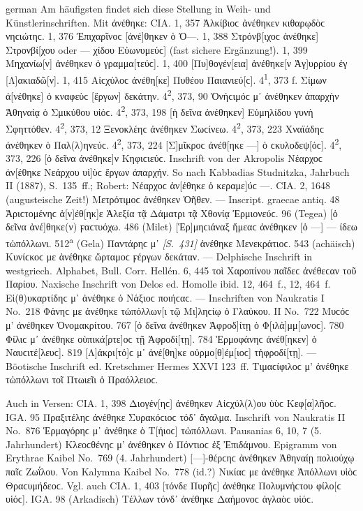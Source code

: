 \begin{otherlanguage*}{german}
Am häufigsten findet sich diese Stellung in Weih- und Künstlerinschriften. Mit ἀνέθηκε: CIA. 1, 357 Ἀλκίβιοϲ ἀνέθηκεν κιθαρῳδὸϲ νηϲιώτηϲ. 1, 376 Ἐπιχαρῖνοϲ [ἀνέ]θηκεν ὁ Ὀ—. 1, 388 Στρόνβ[ιχοϲ ἀνέθηκε] Στρονβί[χου oder — χίδου Εὐ\-ω\-νυ\-μεύϲ] (fast sichere Ergänzung!). 1, 399 Μηχανίω[ν] ἀνέθηκεν ὁ γραμμα[τεύϲ]. 1, 400 [Πυ]θογέν[εια] ἀνέθηκε[ν Ἀγ]υρρίου ἐγ [Λ]ακιαδῶ[ν]. 1, 415 Αἰϲχύλοϲ ἀνέθη[κε] Πυθέου Παιανιεύ[ϲ]. 4\textsuperscript{1}, 373 f. Σίμων ἀ[νέθηκε] ὁ κναφεὺϲ [ἔργων] δεκάτην. 4\textsuperscript{2}, 373, 90 Ὀνήϲιμόϲ μ᾽ ἀνέθηκεν ἀπαρχὴν Ἀθηναίᾳ ὁ Σμικύθου υἱόϲ. 4\textsuperscript{2}, 373, 198 [ἡ δεῖνα ἀνέθηκεν] Εὐμηλίδου γυνὴ Σφηττόθεν. 4\textsuperscript{2}, 373, 12 Ξενοκλέηϲ ἀνέθηκεν Σωϲίνεω. 4\textsuperscript{2}, 373, 223 Χναϊάδηϲ ἀνέ\-θη\-κεν ὁ Παλ(λ)ηνεύϲ. 4\textsuperscript{2}, 373, 224 [Σ]μῖκροϲ ἀνέ\-θ[η\-κε —] ὁ ϲκυλοδεψ[όϲ]. 4\textsuperscript{2}, 373, 226 [ὁ δεῖνα ἀνέθηκε]ν Κηφι\-ϲιεύϲ. In\-schrift von der Akropolis Νέαρχοϲ ἀν[έθηκε Νεάρχου υἱ]ὺϲ ἔργων ἀπαρ\-χήν. So nach Kabbadias Studnitzka, Jahrbuch II (1887), S.~135~ff.; Robert: Νέαρχοϲ ἀν[έθηκε ὁ κεραμε]ύϲ —. CIA. 2, 1648 (augusteische Zeit!) Μετρότιμοϲ ἀνέθηκεν Ὀῆθεν. — Inscript. graecae antiq. 48 Ἀριϲτομένηϲ ἀ[ν]έθ[ηκ]ε Ἀλεξία τᾷ Δάματρι τᾷ Χθονίᾳ Ἑρμιονεύϲ. 96 (Tegea) [ὁ δεῖνα ἀνέ]θηκε(ν) ϝαϲτυόχω. 486 (Milet) [Ἑρ]μηϲιάναξ ἥμεαϲ ἀνέθηκεν [ὁ —] — ίδεω τὠπόλλωνι. 512\textsuperscript{a} (Gela) Παντάρηϲ μ᾽ \hypertarget{p431}{\emph{[S.~431]}}\label{p431} ἀνέθηκε Μενεκράτιοϲ. 543 (achäisch) Κυνίϲκοϲ με ἀνέθηκε ὥρταμοϲ ϝέργων δεκάταν. — Delphische Inschrift in westgriech. Alphabet, Bull. Corr. Hellén. 6, 445 τοὶ Χαροπίνου παῖδεϲ ἀνέθεϲαν τοῦ Παρίου. Naxische Inschrift von Delos ed. Homolle ibid. 12, 464~f., 12, 464~f. Εἰ(θ)υκαρτίδηϲ μ᾽ ἀνέθηκε ὁ Νάξιοϲ ποιήϲαϲ. — Inschriften von Naukratis I No.~218 Φάνηϲ με ἀνέθηκε τὠπόλλων[ι τῷ Μι]ληϲίῳ ὁ Γλαύκου. II No.~722 Μυϲόϲ μ’ ἀνέθηκεν Ὀνομακρίτου. 767 [ὁ δεῖνα ἀνέθηκεν Ἀφροδ]ίτῃ ὁ Φ[ιλά]μμ[ωνοϲ]. 780 Φίλιϲ μ᾽ ἀνέθηκε οὑπικά[ρτε]οϲ τῇ Ἀφροδί[τῃ]. 784 Ἑρμοφάνηϲ ἀνέθ[ηκεν] ὁ Ναυ\-ϲι\-τέ[\-λευϲ]. 819 [Λ]άκρι[τό]ϲ μ᾽ ἀνέ[θη]κε οὑρμο[θ]έμ[ιοϲ] τἠφροδί[τῃ]. — Böotische Inschrift ed. Kretschmer Hermes XXVI 123~ff. Τιμαϲίφιλοϲ μ’ ἀνέθηκε τὠπόλλωνι τοῖ Πτωιεῖι ὁ Πραόλ\-λειοϲ.

Auch in Versen: CIA. 1, 398 Διογέν[ηϲ] ἀνέθηκεν Αἰϲχύλ(λ)ου ὑὺϲ Κεφ[α]λῆοϲ. IGA. 95 Πραξιτέληϲ ἀνέθηκε Συρακόϲιοϲ τόδ᾽ ἄγαλμα. Inschrift von Naukratis II No.~876 Ἑρμαγόρηϲ μ᾽ ἀνέθηκε ὁ Τ[ήιοϲ] τὠπόλλωνι. Pausanias 6, 10, 7 (5. Jahrhundert) Κλεοϲθένηϲ μ’ ἀνέθηκεν ὁ Πόντιοϲ ἐξ Ἐπιδάμνου. Epigramm von Erythrae Kaibel No.~769 (4. Jahrhundert) [—]-θέρϲηϲ ἀνέθηκεν Ἀθηναίῃ πολιούχῳ παῖϲ Ζωΐλου. Von Kalymna Kaibel No.~778 (id.?) Νικίαϲ με ἀνέθηκε Ἀπόλλωνι υἱὸϲ Θραϲυμήδεοϲ. Vgl. auch CIA. 1, 403 [τόνδε Πυρῆϲ] ἀνέθηκε Πολυμνήϲτου φίλο[ϲ υἱόϲ]. IGA. 98 (Arkadisch) Τέλλων τόνδ᾽ ἀνέθηκε Δαήμονοϲ ἀγλαὸϲ υἱόϲ.


\end{otherlanguage*}
